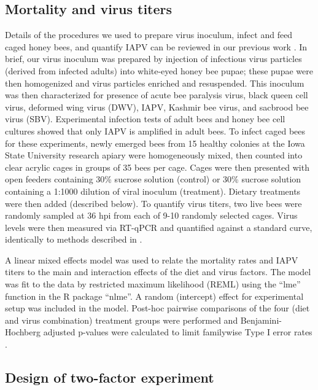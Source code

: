\documentclass{bmcart}
\begin{document}
\begin{linenumbers}
\begin{doublespacing}
\subsection*{Mortality and virus titers}

Details of the procedures we used to prepare virus inoculum, infect and feed caged honey bees, and quantify IAPV can be reviewed in our previous work \cite{adamInt, carrillo}. In brief, our virus inoculum was prepared by injection of infectious virus particles (derived from infected adults) into white-eyed honey bee pupae; these pupae were then homogenized and virus particles enriched and resuspended. This inoculum was then characterized for presence of acute bee paralysis virus, black queen cell virus, deformed wing virus (DWV), IAPV, Kashmir bee virus, and sacbrood bee virus (SBV). Experimental infection tests of adult bees and honey bee cell cultures \cite{carrillo} showed that only IAPV is amplified in adult bees. To infect caged bees for these experiments, newly emerged bees from 15 healthy colonies at the Iowa State University research apiary were homogeneously mixed, then counted into clear acrylic cages in groups of 35 bees per cage. Cages were then presented with open feeders containing 30\% sucrose solution (control) or 30\% sucrose solution containing a 1:1000 dilution of viral inoculum (treatment). Dietary treatments were then added (described below). To quantify virus titers, two live bees were randomly sampled at 36 hpi from each of 9-10 randomly selected cages. Virus levels were then measured via RT-qPCR and quantified against a standard curve, identically to methods described in \cite{carrillo, adamInt}.

A linear mixed effects model was used to relate the mortality rates and IAPV titers to the main and interaction effects of the diet and virus factors. The model was fit to the data by restricted maximum likelihood (REML) using the ``lme'' function in the R package ``nlme''. A random (intercept) effect for experimental setup was included in the model. Post-hoc pairwise comparisons of the four (diet and virus combination) treatment groups were performed and Benjamini-Hochberg adjusted p-values were calculated to limit familywise Type I error rates \cite{bh}.

\subsection*{Design of two-factor experiment}


\end{doublespacing}
\end{linenumbers}
\end{document}
